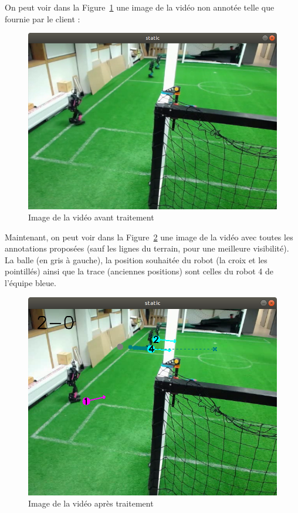 On peut voir dans la Figure~\ref{fig:nonannote} une image de la
vidéo non annotée telle que fournie par le client :

\begin{figure}[H] 
\centering 
\includegraphics[scale = 0.25]{images/imagenonannote.png}
\caption{Image de la vidéo avant traitement}
\label{fig:nonannote}
\end{figure} 
\bigskip

Maintenant, on peut voir  dans la Figure~\ref{fig:annoted} une
image de la vidéo avec toutes les annotations proposées (sauf les
lignes du terrain, pour une meilleure visibilité). La balle (en
gris à gauche), la position souhaitée du robot (la croix et les
pointillés) ainsi que la trace (anciennes positions) sont celles
du robot 4 de l'équipe bleue.

\begin{figure}[H] 
\centering 
\includegraphics[scale = 0.25]{images/imageannote.png}
\caption{Image de la vidéo après traitement}
\label{fig:annoted}
\end{figure} 
\bigskip